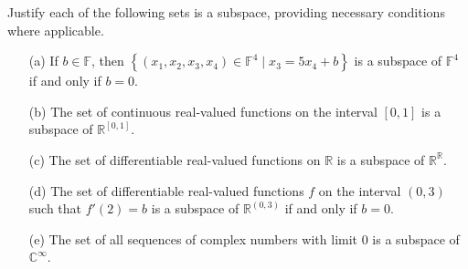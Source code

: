\begin{exercise}
Justify each of the following sets is a subspace, providing necessary conditions where applicable.

\begin{enumerate}
    \item[(a)] If \( b \in \mathbb{F} \), then \(\left\{(x_{1}, x_{2}, x_{3}, x_{4}) \in \mathbb{F}^{4} \mid x_{3} = 5x_{4} + b \right\}\) is a subspace of \(\mathbb{F}^{4}\) if and only if \( b = 0 \).
    
    \item[(b)] The set of continuous real-valued functions on the interval \([0,1]\) is a subspace of \(\mathbb{R}^{[0,1]}\).
    
    \item[(c)] The set of differentiable real-valued functions on \(\mathbb{R}\) is a subspace of \(\mathbb{R}^{\mathbb{R}}\).
    
    \item[(d)] The set of differentiable real-valued functions \( f \) on the interval \((0,3)\) such that \( f'(2) = b \) is a subspace of \(\mathbb{R}^{(0,3)}\) if and only if \( b = 0 \).
    
    \item[(e)] The set of all sequences of complex numbers with limit \( 0 \) is a subspace of \(\mathbb{C}^{\infty}\).
\end{enumerate}
\end{exercise}
